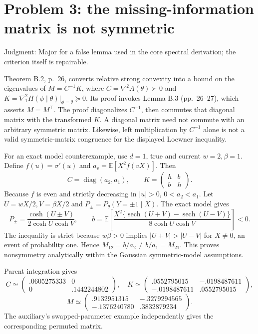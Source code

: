 \documentclass[10pt]{article}
\begin{document}
\section*{Problem 3: the missing-information matrix is not symmetric}
Judgment: Major for a false lemma used in the core spectral derivation; the criterion itself is repairable.\par
Theorem B.2, p. 26, converts relative strong convexity into a bound on the eigenvalues of \(M=C^{-1}K\), where \(C=\nabla^2 A(\theta)\succ0\) and \(K=\nabla^2_1 H(\phi\mid\theta)|_{\phi=\theta}\succeq0\). Its proof invokes Lemma B.3 (pp. 26–27), which asserts \(M=M^\top\). The proof diagonalizes \(C^{-1}\), then commutes that diagonal matrix with the transformed \(K\). A diagonal matrix need not commute with an arbitrary symmetric matrix. Likewise, left multiplication by \(C^{-1}\) alone is not a valid symmetric-matrix congruence for the displayed Loewner inequality.\par
For an exact model counterexample, use \(d=1\), true and current \(w=2,\beta=1\). Define \(f(u)=\sigma'(u)\) and \(a_v=\mathbb E[X^2f(vX)]\). Then \[C=\operatorname{diag}(a_2,a_1),\qquad
 K=\begin{pmatrix}h&b\\b&h\end{pmatrix}.\] Because \(f\) is even and strictly decreasing in \(|u|>0\), \(0<a_2<a_1\). Let \(U=wX/2,V=\beta X/2\) and \(P_\pm=P_{\theta}(Y=\pm1\mid X)\). The exact model gives \[P_\pm=\frac{\cosh(U\pm V)}{2\cosh U\cosh V},\qquad
 b=\mathbb E\!\left[
 \frac{X^2\{\operatorname{sech}(U+V)-\operatorname{sech}(U-V)\}}
 {8\cosh U\cosh V}\right]<0 .\] The inequality is strict because \(w\beta>0\) implies \(|U+V|>|U-V|\) for \(X\ne0\), an event of probability one. Hence \(M_{12}=b/a_2\ne b/a_1=M_{21}\). This proves nonsymmetry analytically within the Gaussian symmetric-model assumptions.\par
Parent integration gives \[C\simeq
 \begin{pmatrix}.0605275333&0\\0&.1442244802\end{pmatrix},\quad
 K\simeq
 \begin{pmatrix}.0552795015&-.0198487611\\-.0198487611&.0552795015\end{pmatrix},\] \[M\simeq
 \begin{pmatrix}
 .9132951315&-.3279294565\\
 -.1376240780&.3832879234
 \end{pmatrix}.\] The auxiliary’s swapped-parameter example independently gives the corresponding permuted matrix.\par
\end{document}
